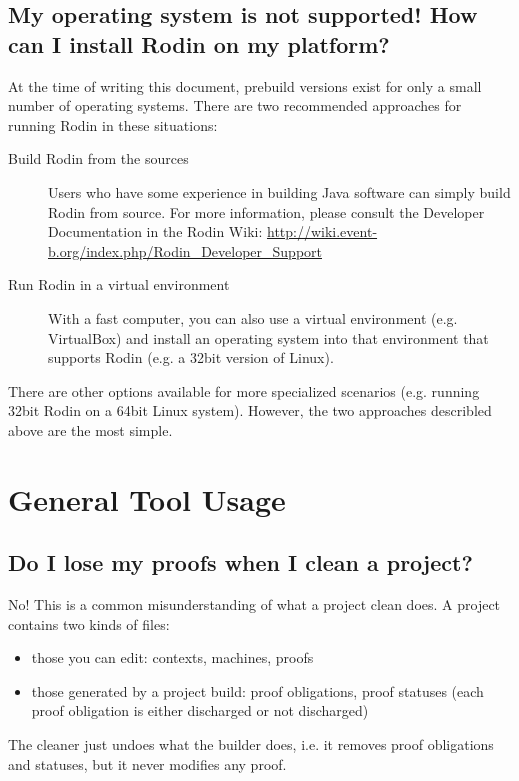 \subsection{My operating system is not supported!  How can I install Rodin on my platform?}
\label{faq_os_not_supported}
At the time of writing this document, prebuild versions exist for only a small number of operating systems.  There are two recommended approaches for running Rodin in these situations:
\begin{description}
	\item[Build Rodin from the sources] Users who have some experience in building Java software can simply build Rodin from source.  For more information, please consult the Developer Documentation in the Rodin Wiki: \url{http://wiki.event-b.org/index.php/Rodin_Developer_Support}
	\item[Run Rodin in a virtual environment] With a fast computer, you can also use a virtual environment (e.g. VirtualBox) and install an operating system into that environment that supports Rodin (e.g. a 32bit version of Linux).
\end{description}

There are other options available for more specialized scenarios (e.g. running 32bit Rodin on a 64bit Linux system).  However, the two approaches describled above are the most simple.

\section{General Tool Usage}

\subsection{Do I lose my proofs when I clean a project?}
No! This is a common misunderstanding of what a project clean does. A project contains two kinds of files: 

\begin{itemize}
	\item those you can edit: contexts, machines, proofs 
	\item those generated by a project build: proof obligations, proof statuses (each proof obligation is either discharged or not discharged) 
\end{itemize}

The cleaner just undoes what the builder does, i.e. it removes proof obligations and statuses, but it never modifies any proof.

